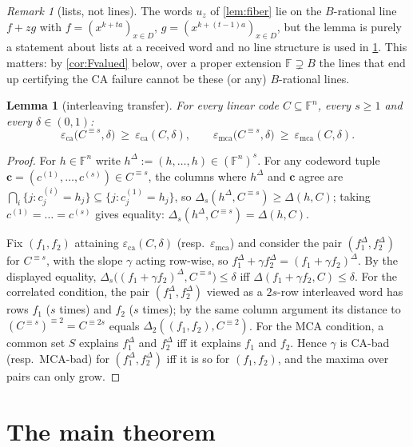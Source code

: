 \documentclass[11pt]{article}
\newtheorem{lemma}[theorem]{Lemma}
\theoremstyle{definition}
\theoremstyle{remark}
\newtheorem{remark}[theorem]{Remark}
\newcommand{\F}{\mathbb{F}}
\newcommand{\B}{B}
\newcommand{\eca}{\varepsilon_{\mathrm{ca}}}
\newcommand{\emca}{\varepsilon_{\mathrm{mca}}}
\newcommand{\dist}{\Delta}
\begin{document}
\begin{remark}[lists, not lines]\label{rem:lines}
The words $u_z$ of \cref{lem:fiber} lie on the $\B$-rational line $f+zg$ with $f=(x^{k+ta})_{x\in D}$, $g=(x^{k+(t-1)a})_{x\in D}$, but the lemma is purely a statement about lists at a received word and no line structure is used in \cref{sec:main}. This matters: by \cref{cor:Fvalued} below, over a proper extension $\F\supsetneq\B$ the lines that end up certifying the CA failure cannot be these (or any) $\B$-rational lines.
\end{remark}

\begin{lemma}[interleaving transfer]\label{lem:inter}
For every linear code $C\subseteq\F^n$, every $s\ge1$ and every $\delta\in(0,1)$:
\[
\eca\bigl(C^{\equiv s},\delta\bigr)\ \ge\ \eca(C,\delta),
\qquad
\emca\bigl(C^{\equiv s},\delta\bigr)\ \ge\ \emca(C,\delta).
\]
\end{lemma}

\begin{proof}
For $h\in\F^n$ write $h^{\Delta}:=(h,\dots,h)\in(\F^n)^s$. For any codeword tuple $\mathbf c=(c^{(1)},\dots,c^{(s)})\in C^{\equiv s}$, the columns where $h^\Delta$ and $\mathbf c$ agree are $\bigcap_i\{j:c^{(i)}_j=h_j\}\subseteq\{j:c^{(1)}_j=h_j\}$, so $\dist_s(h^\Delta,C^{\equiv s})\ge\dist(h,C)$; taking $c^{(1)}=\dots=c^{(s)}$ gives equality:
$\dist_s(h^\Delta,C^{\equiv s})=\dist(h,C)$.

Fix $(f_1,f_2)$ attaining $\eca(C,\delta)$ (resp.\ $\emca$) and consider the pair $(f_1^\Delta,f_2^\Delta)$ for $C^{\equiv s}$, with the slope $\gamma$ acting row-wise, so $f_1^\Delta+\gamma f_2^\Delta=(f_1+\gamma f_2)^\Delta$. By the displayed equality, $\dist_s\bigl((f_1+\gamma f_2)^\Delta,C^{\equiv s}\bigr)\le\delta$ iff $\dist(f_1+\gamma f_2,C)\le\delta$. For the correlated condition, the pair $(f_1^\Delta,f_2^\Delta)$ viewed as a $2s$-row interleaved word has rows $f_1$ ($s$ times) and $f_2$ ($s$ times); by the same column argument its distance to $(C^{\equiv s})^{\equiv2}=C^{\equiv2s}$ equals $\dist_2((f_1,f_2),C^{\equiv2})$. For the MCA condition, a common set $S$ explains $f_1^\Delta$ and $f_2^\Delta$ iff it explains $f_1$ and $f_2$. Hence $\gamma$ is CA-bad (resp.\ MCA-bad) for $(f_1^\Delta,f_2^\Delta)$ iff it is so for $(f_1,f_2)$, and the maxima over pairs can only grow.
\end{proof}

\section{The main theorem}\label{sec:main}
\end{document}
